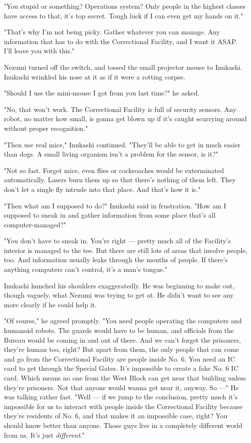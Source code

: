 "You stupid or something? Operations system? Only people in the highest
classes have access to that, it's top secret. Tough luck if I can even
get my hands on it."

"That's why I'm not being picky. Gather whatever you can manage. Any
information that has to do with the Correctional Facility, and I want it
ASAP. I'll leave you with this."

Nezumi turned off the switch, and tossed the small projector mouse to
Inukashi. Inukashi wrinkled his nose at it as if it were a rotting
corpse.

"Should I use the mini-mouse I got from you last time?" he asked.

"No, that won't work. The Correctional Facility is full of security
sensors. Any robot, no matter how small, is gonna get blown up if it's
caught scurrying around without proper recognition."

"Then use real mice," Inukashi continued. "They'll be able to get in
much easier than dogs. A small living organism isn't a problem for the
sensor, is it?"

"Not so fast. Forget mice, even flies or cockroaches would be
exterminated automatically. Lasers burn them up so that there's nothing
of them left. They don't let a single fly intrude into that place. And
that's how it is."

"Then what am I supposed to do?" Inukashi said in frustration. "How am I
supposed to sneak in and gather information from some place that's all
computer-managed?"

"You don't have to sneak in. You're right --- pretty much all of the
Facility's interior is managed to the tee. But there are still lots of
areas that involve people, too. And information usually leaks through
the mouths of people. If there's anything computers can't control, it's
a man's tongue."

Inukashi hunched his shoulders exaggeratedly. He was beginning to make
out, though vaguely, what Nezumi was trying to get at. He didn't want to
see any more clearly if he could help it.

"Of course," he agreed promptly. "You need people operating the
computers and humanoid robots. The guards would have to be human, and
officials from the Bureau would be coming in and out of there. And we
can't forget the prisoners, they're human too, right? But apart from
them, the only people that can come and go from the Correctional
Facility are people inside No. 6. You need an IC card to get through the
Special Gates. It's impossible to create a fake No. 6 IC card. Which
means no one from the West Block can get near that building unless
they're prisoners. Not that anyone would wanna get near it, anyway. So
---" He was talking rather fast. "Well --- if we jump to the conclusion,
pretty much it's impossible for us to interact with people inside the
Correctional Facility because they're residents of No. 6, and that makes
it an impossible case, right? You should know better than anyone. Those
guys live in a completely different world from us. It's just \emph{different}."

